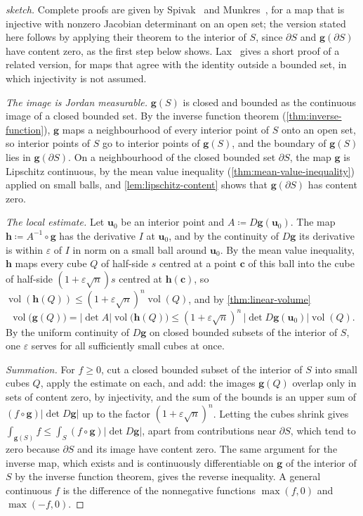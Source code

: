 \begin{proof}[sketch]
Complete proofs are given by Spivak~\cite[Thm.~3-13]{spivak1965manifolds} and Munkres~\cite[Chap.~4]{munkres1991}, for a map that is injective with nonzero Jacobian determinant on an open set; the version stated here follows by applying their theorem to the interior of $S$, since $\partial S$ and $\mathbf g(\partial S)$ have content zero, as the first step below shows. Lax~\cite{lax1999} gives a short proof of a related version, for maps that agree with the identity outside a bounded set, in which injectivity is not assumed.

\emph{The image is Jordan measurable.} $\mathbf g(S)$ is closed and bounded as the continuous image of a closed bounded set. By the inverse function theorem (\cref{thm:inverse-function}), $\mathbf g$ maps a neighbourhood of every interior point of $S$ onto an open set, so interior points of $S$ go to interior points of $\mathbf g(S)$, and the boundary of $\mathbf g(S)$ lies in $\mathbf g(\partial S)$. On a neighbourhood of the closed bounded set $\partial S$, the map $\mathbf g$ is Lipschitz continuous, by the mean value inequality (\cref{thm:mean-value-inequality}) applied on small balls, and \cref{lem:lipschitz-content} shows that $\mathbf g(\partial S)$ has content zero.

\emph{The local estimate.} Let $\mathbf u_0$ be an interior point and $A\coloneqq D\mathbf g(\mathbf u_0)$. The map $\mathbf h\coloneqq A^{-1}\circ\mathbf g$ has the derivative $I$ at $\mathbf u_0$, and by the continuity of $D\mathbf g$ its derivative is within $\varepsilon$ of $I$ in norm on a small ball around $\mathbf u_0$. By the mean value inequality, $\mathbf h$ maps every cube $Q$ of half-side $s$ centred at a point $\mathbf c$ of this ball into the cube of half-side $(1+\varepsilon\sqrt n)s$ centred at $\mathbf h(\mathbf c)$, so $\operatorname{vol}(\mathbf h(Q))\le(1+\varepsilon\sqrt n)^n\operatorname{vol}(Q)$, and by \cref{thm:linear-volume}
\[
\operatorname{vol}\bigl(\mathbf g(Q)\bigr)=|\det A|\operatorname{vol}\bigl(\mathbf h(Q)\bigr)\le(1+\varepsilon\sqrt n)^n\,|\det D\mathbf g(\mathbf u_0)|\operatorname{vol}(Q).
\]
By the uniform continuity of $D\mathbf g$ on closed bounded subsets of the interior of $S$, one $\varepsilon$ serves for all sufficiently small cubes at once.

\emph{Summation.} For $f\ge0$, cut a closed bounded subset of the interior of $S$ into small cubes $Q$, apply the estimate on each, and add: the images $\mathbf g(Q)$ overlap only in sets of content zero, by injectivity, and the sum of the bounds is an upper sum of $(f\circ\mathbf g)|\det D\mathbf g|$ up to the factor $(1+\varepsilon\sqrt n)^n$. Letting the cubes shrink gives $\int_{\mathbf g(S)}f\le\int_S(f\circ\mathbf g)|\det D\mathbf g|$, apart from contributions near $\partial S$, which tend to zero because $\partial S$ and its image have content zero. The same argument for the inverse map, which exists and is continuously differentiable on $\mathbf g$ of the interior of $S$ by the inverse function theorem, gives the reverse inequality. A general continuous $f$ is the difference of the nonnegative functions $\max(f,0)$ and $\max(-f,0)$.
\end{proof}

